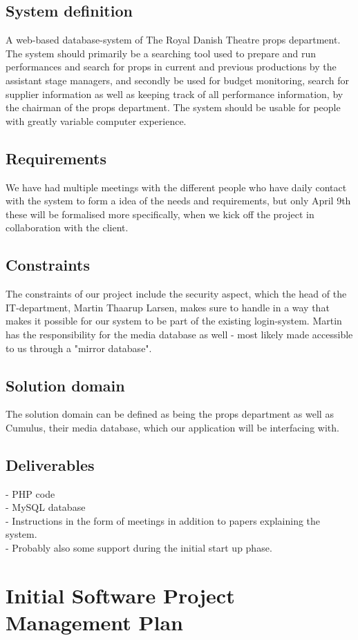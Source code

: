 \documentclass[12pt]{article}
\begin{document}
\subsection{System definition}
A web-based database-system of The Royal Danish Theatre props department. The system should primarily be a searching tool used to prepare and run performances and search for props in current and previous productions by the assistant stage managers, and secondly be used for budget monitoring, search for supplier information as well as keeping track of all performance information, by the chairman of the props department. The system should be usable for people with greatly variable computer experience.
\subsection{Requirements}
We have had multiple meetings with the different people who have daily contact with the system to form a idea of the needs and requirements, but only April 9th these will be formalised more specifically, when we kick off the project in collaboration with the client.
\subsection{Constraints}
The constraints of our project include the security aspect, which the head of the IT-department, Martin Thaarup Larsen, makes sure to handle in a way that makes it possible for our system to be part of the existing login-system. Martin has the responsibility for the media database as well - most likely made accessible to us through a "mirror database".   
\subsection{Solution domain}
The solution domain can be defined as being the props department as well as Cumulus, their media database, which our application will be interfacing with.
\subsection{Deliverables}
- PHP code \\
- MySQL database \\
- Instructions in the form of meetings in addition to papers explaining the system.\\
- Probably also some support during the initial start up phase.
\section{Initial Software Project Management Plan}
\end{document}
